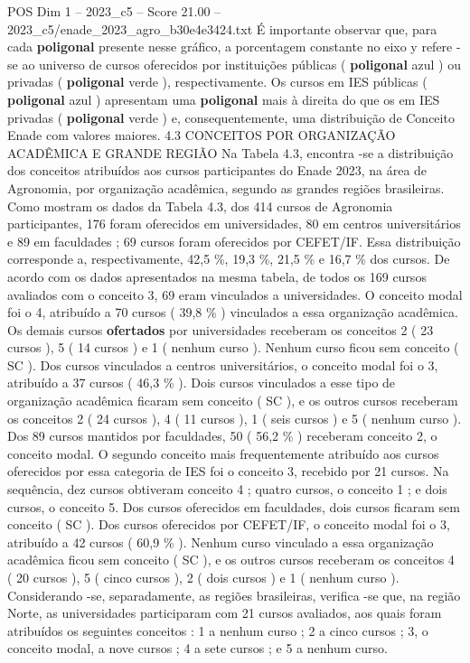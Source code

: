 \begin{textsample}{POS Dim 1 – 2023\_c5 – Score 21.00 – 2023\_c5/enade\_2023\_agro\_b30e4e3424.txt}
É importante observar que, para cada \textbf{poligonal} presente nesse gráfico, a porcentagem constante no eixo y refere -se ao universo de cursos oferecidos por instituições públicas ( \textbf{poligonal} azul ) ou privadas ( \textbf{poligonal} verde ), respectivamente.
Os cursos em IES públicas ( \textbf{poligonal} azul ) apresentam uma \textbf{poligonal} mais à direita do que os em IES privadas ( \textbf{poligonal} verde ) e, consequentemente, uma distribuição de Conceito Enade com valores maiores. 4.3 CONCEITOS POR ORGANIZAÇÃO ACADÊMICA E GRANDE REGIÃO Na Tabela 4.3, encontra -se a distribuição dos conceitos atribuídos aos cursos participantes do Enade 2023, na área de Agronomia, por organização acadêmica, segundo as grandes regiões brasileiras.
Como mostram os dados da Tabela 4.3, dos 414 cursos de Agronomia participantes, 176 foram oferecidos em universidades, 80 em centros universitários e 89 em faculdades ; 69 cursos foram oferecidos por CEFET/IF.
Essa distribuição corresponde a, respectivamente, 42,5 \%, 19,3 \%, 21,5 \% e 16,7 \% dos cursos.
De acordo com os dados apresentados na mesma tabela, de todos os 169 cursos avaliados com o conceito 3, 69 eram vinculados a universidades.
O conceito modal foi o 4, atribuído a 70 cursos ( 39,8 \% ) vinculados a essa organização acadêmica.
Os demais cursos \textbf{ofertados} por universidades receberam os conceitos 2 ( 23 cursos ), 5 ( 14 cursos ) e 1 ( nenhum curso ).
Nenhum curso ficou sem conceito ( SC ).
Dos cursos vinculados a centros universitários, o conceito modal foi o 3, atribuído a 37 cursos ( 46,3 \% ).
Dois cursos vinculados a esse tipo de organização acadêmica ficaram sem conceito ( SC ), e os outros cursos receberam os conceitos 2 ( 24 cursos ), 4 ( 11 cursos ), 1 ( seis cursos ) e 5 ( nenhum curso ).
Dos 89 cursos mantidos por faculdades, 50 ( 56,2 \% ) receberam conceito 2, o conceito modal.
O segundo conceito mais frequentemente atribuído aos cursos oferecidos por essa categoria de IES foi o conceito 3, recebido por 21 cursos.
Na sequência, dez cursos obtiveram conceito 4 ; quatro cursos, o conceito 1 ; e dois cursos, o conceito 5.
Dos cursos oferecidos em faculdades, dois cursos ficaram sem conceito ( SC ).
Dos cursos oferecidos por CEFET/IF, o conceito modal foi o 3, atribuído a 42 cursos ( 60,9 \% ).
Nenhum curso vinculado a essa organização acadêmica ficou sem conceito ( SC ), e os outros cursos receberam os conceitos 4 ( 20 cursos ), 5 ( cinco cursos ), 2 ( dois cursos ) e 1 ( nenhum curso ).
Considerando -se, separadamente, as regiões brasileiras, verifica -se que, na região Norte, as universidades participaram com 21 cursos avaliados, aos quais foram atribuídos os seguintes conceitos : 1 a nenhum curso ; 2 a cinco cursos ; 3, o conceito modal, a nove cursos ; 4 a sete cursos ; e 5 a nenhum curso.

\end{textsample}
